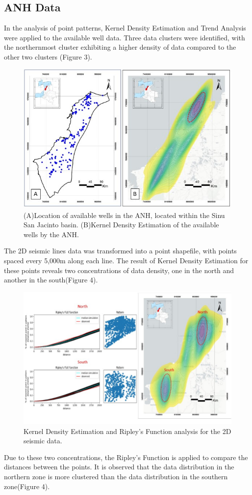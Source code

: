 \documentclass{ifacconf}
\begin{document}
\subsection{ANH Data}
In the analysis of point patterns, Kernel Density Estimation and Trend Analysis were applied to the available well data. Three data clusters were identified, with the northernmost cluster exhibiting a higher density of data compared to the other two clusters (Figure 3).
\begin{figure}[h]
	\centering
	\includegraphics[width=1\linewidth]{img/Pozos}
	\caption{(A)Location of available wells in the ANH, located within the Sinu San Jacinto basin. (B)Kernel Density Estimation of the available wells by the ANH.}
	\label{fig:pozos}
\end{figure}


The 2D seismic lines data was transformed into a point shapefile, with points spaced every 5,000m along each line. The result of Kernel Density Estimation for these points reveals two concentrations of data density, one in the north and another in the south(Figure 4).
\begin{figure}[h]
	\centering
	\includegraphics[width=0.8\linewidth]{img/sismica2d}
	\caption{Kernel Density Estimation and Ripley's Function analysis for the 2D seismic data.}
	\label{fig:sismica2d}
\end{figure}
Due to these two concentrations, the Ripley's Function is applied to compare the distances between the points. It is observed that the data distribution in the northern zone is more clustered than the data distribution in the southern zone(Figure 4).
\end{document}
